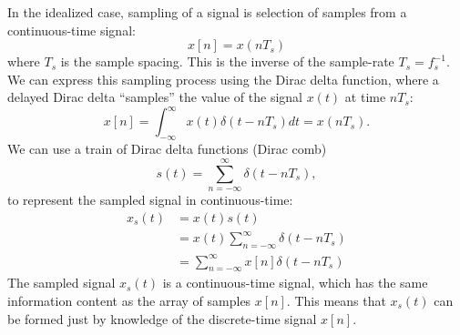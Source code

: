 In the idealized case, sampling of a signal is selection of samples from a continuous-time signal:
\begin{equation}
  x[n] = x(nT_s)
\end{equation}
where $T_s$ is the sample spacing. This is the inverse of the sample-rate $T_s = f_s^{-1}$. 
We can express this sampling process using the Dirac delta function, 
where a delayed Dirac delta ``samples'' the value of the signal $x(t)$ at time $nT_s$:
\begin{equation}
  x[n] = \int_{-\infty}^{\infty}x(t)\delta(t-nT_s)dt = x(nT_s).
\end{equation}
We can use a train of Dirac delta functions (Dirac comb)
\begin{equation}
  s(t) = \sum_{n=-\infty}^{\infty}\delta(t-nT_s),
\end{equation}
to represent the sampled signal in continuous-time:
\begin{align}
  x_s(t) & = x(t) s(t)                                     \\
         & = x(t) \sum_{n=-\infty}^{\infty} \delta(t-nT_s) \\
         & = \sum_{n=-\infty}^{\infty} x[n]\delta(t-nT_s)
\end{align}
The sampled signal $x_s(t)$ is a continuous-time signal, which has the same information 
content as the array of samples $x[n]$. This means that $x_s(t)$ can be formed just by 
knowledge of the discrete-time signal $x[n]$.

